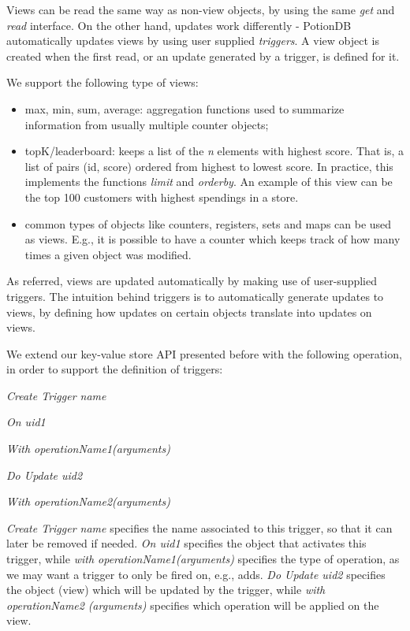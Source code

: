 \documentclass{vldb}
\newcommand{\grumbler}[2]{{\color{red}{\bf #1:} #2}}
\renewcommand{\grumbler}[2]{}
\newcommand{\andre}[1]{\grumbler{andre}{#1}}
\newcommand{\emphvspace}{0.5\baselineskip}
\newcommand{\firstblockemph}[1]{\vspace{\emphvspace}\hspace{2em}\emph{#1}}
\newcommand{\middleblockemph}[1]{\hspace{2em}\emph{#1}}
\newcommand{\lastblockemph}[1]{\hspace{2em}\emph{#1}\vspace{\emphvspace}}
\begin{document}
Views can be read the same way as non-view objects, by using the same \emph{get} and \emph{read} interface.
On the other hand, updates work differently - PotionDB automatically updates views by using user supplied \emph{triggers}.
A view object is created when the first read, or an update generated by a trigger, is defined for it.

We support the following type of views:
\begin{itemize}
	\item max, min, sum, average: aggregation functions used to summarize information from usually multiple counter objects;
	\item topK/leaderboard: keeps a list of the \emph{n} elements with highest score. That is, a list of pairs (id, score) ordered from highest to lowest score. In practice, this implements the functions \emph{limit} and \emph{orderby}. An example of this view can be the top 100 customers with highest spendings in a store.
	\item common types of objects like counters, registers, sets and maps can be used as views. E.g., it is possible to have a counter which keeps track of how many times a given object was modified.
\end{itemize}

As referred, views are updated automatically by making use of user-supplied triggers.
The intuition behind triggers is to automatically generate updates to views, by defining how updates on certain objects translate into updates on views.
\andre{How do I refer that this is a common practice too in relational databases?}
We extend our key-value store API presented before with the following operation, in order to support the definition of triggers:

\firstblockemph{Create Trigger name}

\middleblockemph{On uid1}

\middleblockemph{With operationName1(arguments)}

\middleblockemph{Do Update uid2}

\lastblockemph{With operationName2(arguments)}

\emph{Create Trigger name} specifies the name associated to this trigger, so that it can later be removed if needed.
\emph{On uid1} specifies the object that activates this trigger, while \emph{with operationName1(arguments)} specifies the type of operation, as we may want a trigger to only be fired on, e.g., adds.
\emph{Do Update uid2} specifies the object (view) which will be updated by the trigger, while \emph{with}  \emph{operationName2} \emph{(arguments)} specifies which operation will be applied on the view.
\end{document}
